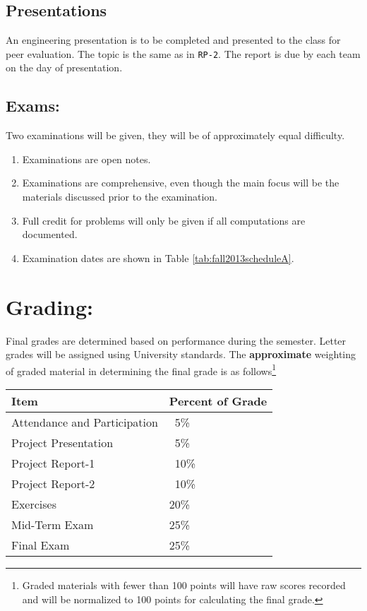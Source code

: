 \documentclass[12pt]{article}
\begin{document}
\subsection*{Presentations}
An engineering presentation is to be completed and presented to the class for peer evaluation. 
The topic is the same as in \texttt{RP-2}.   The report is due by each team on the day of presentation.

\subsection*{Exams:} Two examinations will be given, they will be of approximately equal difficulty.
\begin{enumerate}
\item Examinations are open notes.
\item Examinations are comprehensive, even though the main focus will be the materials discussed prior to the examination.
\item Full credit for problems will only be given if all computations are documented.
\item Examination dates are shown in Table \ref{tab:fall2013scheduleA}.
\end{enumerate}

\section*{Grading:} Final grades are determined based on performance during the semester.  Letter grades will be assigned using University standards.  The \textbf{approximate} weighting of graded material in determining the final grade is as follows\footnote{Graded materials with fewer than 100 points will have raw scores recorded and will be normalized to 100 points for calculating the final grade.}
\begin{table}[h!]
   \centering
   \begin{tabular}{l l}
Item & Percent of Grade \\
\hline
\hline
Attendance and Participation & ~5\% \\
Project Presentation & ~5\% \\
Project Report-1 & ~10\% \\
Project Report-2 & ~10\% \\
Exercises & 20\% \\
Mid-Term Exam & 25\% \\
Final Exam & 25\% \\
\hline
\end{tabular}
\end{table}
\end{document}
